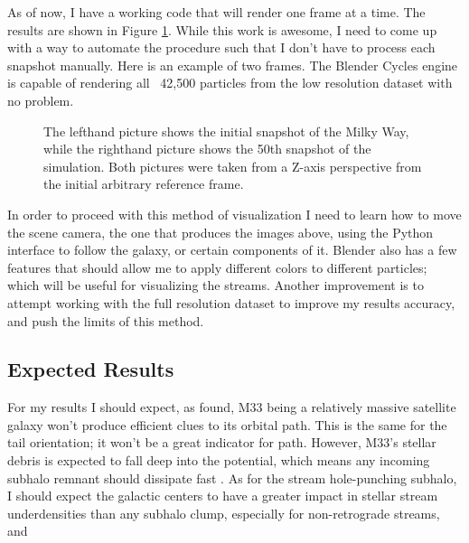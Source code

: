 \documentclass{aastex63}
\begin{document}
As of now, I have a working code that will render one frame at a time.
The results are shown in Figure \ref{fig:snapshots}. While this work is 
awesome, I need to come up with a way to automate the procedure such that I 
don't have to process each snapshot manually. Here is an example of two 
frames. The Blender Cycles engine is capable of rendering all ~42,500 
particles from the low resolution dataset with no problem. 

\begin{figure}[h!]
\caption{The lefthand picture shows the initial  snapshot of the Milky Way, 
while the righthand picture shows the 50th snapshot of the simulation.
Both pictures were taken from a Z-axis perspective from the initial 
arbitrary reference frame.
\label{fig:snapshots}}
\end{figure}

In order to proceed with this method of visualization I need to learn how to 
move the scene camera, the one that produces the images above, using the 
Python interface to follow the galaxy, or certain components of it.
Blender also has a few features that should allow me to apply different colors
to different particles; which will be useful for visualizing the streams. Another
improvement is to attempt working with the full resolution dataset to improve
my results accuracy, and push the limits of this method.

\subsection{Expected Results\label{subsec:results}}

For my results I should expect, as \citet{2017MNRAS.464.2882A, 2007MNRAS.381..987C}
found, M33 being a relatively massive satellite galaxy won't produce efficient 
clues to its orbital path. This is the same for the tail orientation; it won't be a
great indicator for path. However, M33's stellar debris is expected to fall deep 
into the potential, which means any incoming subhalo remnant should dissipate fast 
\citep{2017MNRAS.464.2882A}. As for the stream hole-punching subhalo, I should expect the galactic centers to have a greater impact in stellar stream underdensities than any subhalo clump, especially for non-retrograde streams, and 

\end{document}
